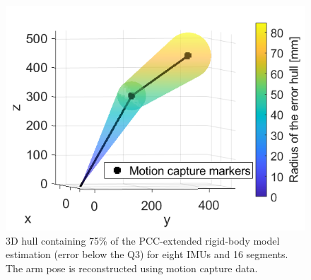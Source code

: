 \begin{figure}
    \centering
    \includegraphics[width=\linewidth]{fig/hull2.png}
    \caption{3D hull containing 75\% of the PCC-extended rigid-body model estimation (error below the Q3) for eight IMUs and 16 segments. The arm pose is reconstructed using motion capture data. }
    \label{fig:hull}
\end{figure}






